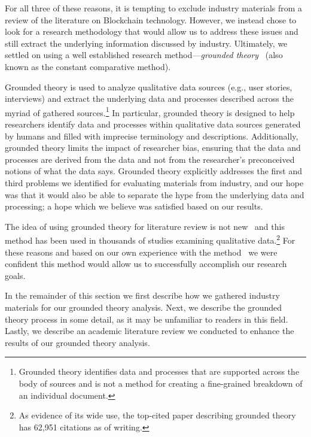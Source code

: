 For all three of these reasons, it is tempting to exclude industry materials from a review of the literature on Blockchain technology.
However, we instead chose to look for a research methodology that would allow us to address these issues and still extract the underlying information discussed by industry.
Ultimately, we settled on using a well established research method---\emph{grounded theory}~\cite{glaser1965constant,strauss1990basics,corbin1990grounded} (also known as the constant comparative method).

Grounded theory is used to analyze qualitative data sources (e.g., user stories, interviews) and extract the underlying data and processes described across the myriad of gathered sources.\footnote{Grounded theory identifies data and processes that are supported across the body of sources and is not a method for creating a fine-grained breakdown of an individual document.}
In particular, grounded theory is designed to help researchers identify data and processes within qualitative data sources generated by humans and filled with imprecise terminology and descriptions.
Additionally, grounded theory limits the impact of researcher bias, ensuring that the data and processes are derived from the data and not from the researcher's preconceived notions of what the data says.
Grounded theory explicitly addresses the first and third problems we identified for evaluating materials from industry, and our hope was that it would also be able to separate the hype from the underlying data and processing; a hope which we believe was satisfied based on our results.

The idea of using grounded theory for literature review is not new~\cite{wolfswinkel2013using,yang2012descriptive} and this method has been used in thousands of studies examining qualitative data.\footnote{As evidence of its wide use, the top-cited paper describing grounded theory has 62,951 citations as of writing.}
For these reasons and based on our own experience with the method~\cite{ruoti2017weighing} we were confident this method would allow us to successfully accomplish our research goals.

In the remainder of this section we first describe how we gathered industry materials for our grounded theory analysis.
Next, we describe the grounded theory process in some detail, as it may be unfamiliar to readers in this field.
Lastly, we describe an academic literature review we conducted to enhance the results of our grounded theory analysis.

